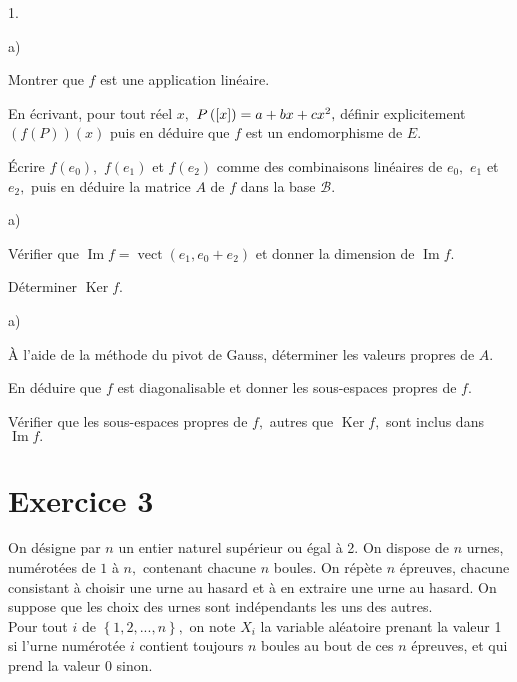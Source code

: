 \documentclass[11pt]{article}%
\begin{document}
\begin{noliste}{1.}
 \setlength{\itemsep}{4mm}
\item
\begin{noliste}{a)}
 \setlength{\itemsep}{2mm}
\item Montrer que $f$ est une application linéaire.

\item En écrivant, pour tout réel $x,$ $P\left(\left[ {x} \right]\right) = a + bx +
cx^{2},$ définir
explicitement $(f(P))(x)$ puis en déduire que $f$ est un endomorphisme
de $E.
$

\item Écrire $f(e_{0}),$ $f(e_{1})$ et $f(e_{2})$ comme des
combinaisons
linéaires de $e_{0},$ $e_{1}$ et $e_{2},$ puis en déduire la matrice
$A$ de
$f$ dans la base $\mathcal{B}.$
\end{noliste}

\item
\begin{noliste}{a)}
 \setlength{\itemsep}{2mm}
\item Vérifier que $\operatorname*{Im}f = \operatorname{vect}\left(
e_{1},e_{0} + e_{2}\right) $ et donner la dimension de
$\operatorname{Im}f.$

\item Déterminer $\operatorname{Ker}f.$
\end{noliste}

\item
\begin{noliste}{a)}
 \setlength{\itemsep}{2mm}
\item À l'aide de la méthode du pivot de Gauss, déterminer les valeurs
propres
de $A.$

\item En déduire que $f$ est diagonalisable et donner les sous-espaces
propres
de $f.$

\item Vérifier que les sous-espaces propres de $f,$ autres que
$\operatorname*{Ker}f,$ sont inclus dans $\operatorname{Im}f.$
\end{noliste}
\end{noliste}

\section*{Exercice 3}

On désigne par $n$ un entier naturel supérieur ou égal à 2. On dispose
de $n$
urnes, numérotées de $1$ à $n,$ contenant chacune $n$ boules. On répète
$n$
épreuves, chacune consistant à choisir une urne au hasard et à en
extraire une
urne au hasard. On suppose que les choix des urnes sont indépendants
les uns
des autres.\\
 Pour tout $i$ de $\left\{ 1,2,...,n\right\},$ on note
$X_{i}$ la variable aléatoire prenant la valeur 1 si l'urne numérotée
$i$
contient toujours $n$ boules au bout de ces $n$ épreuves, et qui prend
la
valeur 0 sinon.
\end{document}
